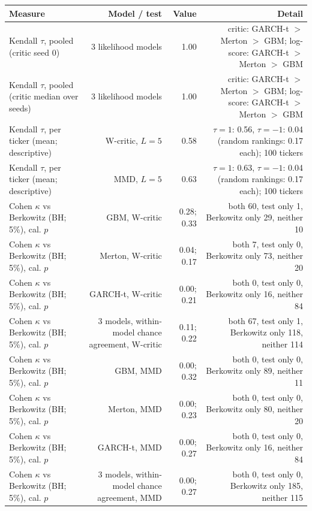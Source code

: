 \begin{tabular}{lrrr}
\toprule
Measure & Model / test & Value & Detail \\
\midrule
Kendall $\tau$, pooled (critic seed 0) & 3 likelihood models & 1.00 & critic: GARCH-t $>$ Merton $>$ GBM; log-score: GARCH-t $>$ Merton $>$ GBM \\
Kendall $\tau$, pooled (critic median over seeds) & 3 likelihood models & 1.00 & critic: GARCH-t $>$ Merton $>$ GBM; log-score: GARCH-t $>$ Merton $>$ GBM \\
Kendall $\tau$, per ticker (mean; descriptive) & W-critic, $L=5$ & 0.58 & $\tau=1$: 0.56, $\tau=-1$: 0.04 (random rankings: 0.17 each); 100 tickers \\
Kendall $\tau$, per ticker (mean; descriptive) & MMD, $L=5$ & 0.63 & $\tau=1$: 0.63, $\tau=-1$: 0.04 (random rankings: 0.17 each); 100 tickers \\
Cohen $\kappa$ vs Berkowitz (BH; 5\%), cal. $p$ & GBM, W-critic & 0.28; 0.33 & both 60, test only 1, Berkowitz only 29, neither 10 \\
Cohen $\kappa$ vs Berkowitz (BH; 5\%), cal. $p$ & Merton, W-critic & 0.04; 0.17 & both 7, test only 0, Berkowitz only 73, neither 20 \\
Cohen $\kappa$ vs Berkowitz (BH; 5\%), cal. $p$ & GARCH-t, W-critic & 0.00; 0.21 & both 0, test only 0, Berkowitz only 16, neither 84 \\
Cohen $\kappa$ vs Berkowitz (BH; 5\%), cal. $p$ & 3 models, within-model chance agreement, W-critic & 0.11; 0.22 & both 67, test only 1, Berkowitz only 118, neither 114 \\
Cohen $\kappa$ vs Berkowitz (BH; 5\%), cal. $p$ & GBM, MMD & 0.00; 0.32 & both 0, test only 0, Berkowitz only 89, neither 11 \\
Cohen $\kappa$ vs Berkowitz (BH; 5\%), cal. $p$ & Merton, MMD & 0.00; 0.23 & both 0, test only 0, Berkowitz only 80, neither 20 \\
Cohen $\kappa$ vs Berkowitz (BH; 5\%), cal. $p$ & GARCH-t, MMD & 0.00; 0.27 & both 0, test only 0, Berkowitz only 16, neither 84 \\
Cohen $\kappa$ vs Berkowitz (BH; 5\%), cal. $p$ & 3 models, within-model chance agreement, MMD & 0.00; 0.27 & both 0, test only 0, Berkowitz only 185, neither 115 \\
\bottomrule
\end{tabular}

